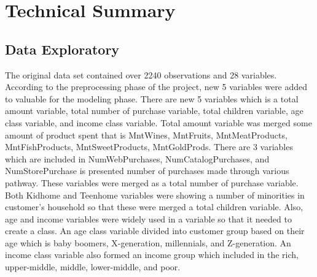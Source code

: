 \documentclass[11pt]{article} %
\begin{document}
\newpage
\section{Technical Summary}
\subsection{Data Exploratory}
\quad The original data set contained over 2240 observations and 28 variables. According to the preprocessing phase of the project, new 5 variables were added to valuable for the modeling phase. There are new 5 variables which is a total amount variable, total number of purchase variable, total children variable, age class variable, and income class variable. Total amount variable was merged some amount of product spent that is MntWines, MntFruits, MntMeatProducts, MntFishProducts, MntSweetProducts, MntGoldProds. There are 3 variables which are included in NumWebPurchases, NumCatalogPurchases, and NumStorePurchase is presented number of purchases made through various pathway. These variables were merged as a total number of purchase variable.  Both Kidhome and Teenhome variables were showing a number of minorities in customer’s household so that these were merged a total children variable.  Also, age and income variables were widely used in a variable so that it needed to create a class. An age class variable divided into customer group based on their age which is baby boomers, X-generation, millennials, and Z-generation.  An income class variable also formed an income group which included in the rich, upper-middle, middle, lower-middle, and poor. 
\end{document}
